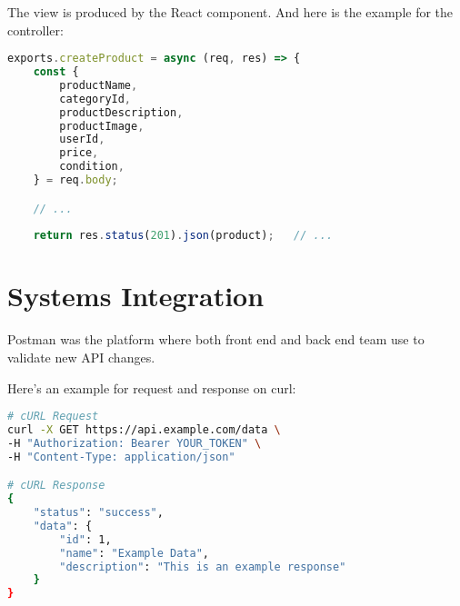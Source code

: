 The view is produced by the React component. And here is the example for the controller:

\begin{lstlisting}[language=JavaScript, caption={Controller for MVC architecture}]
exports.createProduct = async (req, res) => {
	const {
		productName,
		categoryId,
		productDescription,
		productImage,
		userId,
		price,
		condition,
	} = req.body;

	// ...
	
	return res.status(201).json(product); 	// ...
\end{lstlisting}

\section{Systems Integration}

Postman was the platform where both front end and back end team use to validate new API changes.

Here's an example for request and response on curl:


\begin{lstlisting}[language=bash, caption={Example for API integration}]
# cURL Request
curl -X GET https://api.example.com/data \
-H "Authorization: Bearer YOUR_TOKEN" \
-H "Content-Type: application/json"

# cURL Response
{
	"status": "success",
	"data": {
		"id": 1,
		"name": "Example Data",
		"description": "This is an example response"
	}
}
\end{lstlisting}

\clearpage